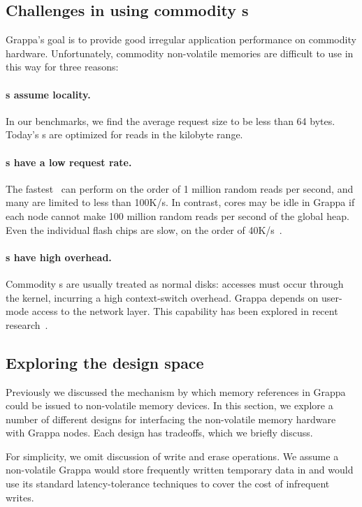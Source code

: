 \subsection{Challenges in using commodity s}
Grappa's goal is to provide good irregular application performance on
commodity hardware. Unfortunately, commodity non-volatile memories are
difficult to use in this way for three reasons:

\paragraph{s assume locality.} In our benchmarks, we find the average request size to be
less than 64 bytes. Today's s are optimized for reads in the
kilobyte range.  

\paragraph{s have a low request rate.} The fastest~\cite{fusionio} can
perform on the order of 1 million random reads per second, and many
are limited to less than 100K/s. In contrast, cores may be idle in
Grappa if each node cannot make 100 million random reads per second of
the global heap. Even the individual flash chips are slow, on the order of 40K/s~\cite{micronFlash}.

\paragraph{s have high overhead.} Commodity s are usually treated
as normal disks: accesses must occur through the kernel, incurring a
high context-switch overhead. Grappa depends on user-mode access to
the network layer. This capability has been explored in recent research~\cite{caulfield:2012}.

\subsection{Exploring the design space}

Previously we discussed the mechanism by which memory references in
Grappa could be issued to non-volatile memory devices. In this
section, we explore a number of different designs for interfacing the
non-volatile memory hardware with Grappa nodes. Each design has
tradeoffs, which we briefly discuss.

For simplicity, we omit discussion of write and erase operations. We
assume a non-volatile Grappa would store frequently written temporary
data in  and would use its standard latency-tolerance techniques
to cover the cost of infrequent writes.

